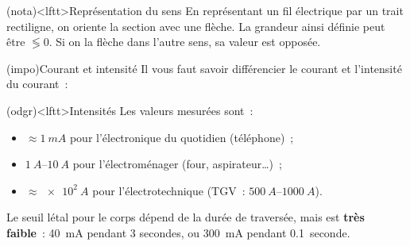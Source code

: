 \documentclass[../../main/main.tex]{subfiles}
\begin{document}
\begin{tcb}[label=nota:intensconv, sidebyside, righthand
		ratio=.4](nota)<lftt>{Représentation du sens}
	En représentant un fil électrique par un trait rectiligne, on oriente la
	section avec une flèche. La grandeur ainsi définie peut être $\lessgtr 0$. Si
	on la flèche dans l'autre sens, sa valeur est opposée.
	\tcblower
	\begin{center}
	\end{center}
\end{tcb}
\begin{tcb}[label=impo:courantintensité](impo){Courant et intensité}
	Il vous faut savoir différencier le courant et l'intensité du courant~:
	\smallbreak
	\begin{isd}[cnt]
		\vspace*{-10pt}
		\tcblower
		\vspace*{-10pt}
	\end{isd}
\end{tcb}
\begin{tcb}[label=odgr:intensité](odgr)<lftt>{Intensités}
	Les valeurs mesurées sont~:
	\begin{itemize}
		\item $\approx \SI{1}{mA}$ pour l'électronique du quotidien
		      (téléphone)~;
		\item $\SIrange{1}{10}{A}$ pour l'électroménager (four,
		      aspirateur…)~;
		\item $\approx \SI{e2}{A}$ pour l'électrotechnique (TGV~:
		      $\SIrange{500}{1000}{A}$).
	\end{itemize}
	Le seuil létal pour le corps dépend de la durée de traversée, mais est
	\textbf{très faible}~: \SI{40}{mA} pendant 3 secondes, ou \SI{300}{mA}
	pendant \SI{0.1}{seconde}.
\end{tcb}
\end{document}
